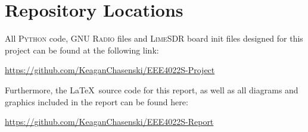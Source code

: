 \documentclass[class=report,11pt,crop=false]{standalone}
\begin{document}
\chapter{Repository Locations}\label{Appendix-A}
All \textsc{Python} code, \textsc{GNU Radio} files and \textsc{LimeSDR} board init files designed for this project can be found at the following link:

\begin{center}
    \url{https://github.com/KeaganChasenski/EEE4022S-Project}
\end{center}

\vspace{1cm}

Furthermore, the \LaTeX~source code for this report, as well as all diagrams and graphics included in the report can be found here: 

\begin{center}
    \url{https://github.com/KeaganChasenski/EEE4022S-Report}
\end{center}


\ifstandalone
% 
\fi
\end{document}
